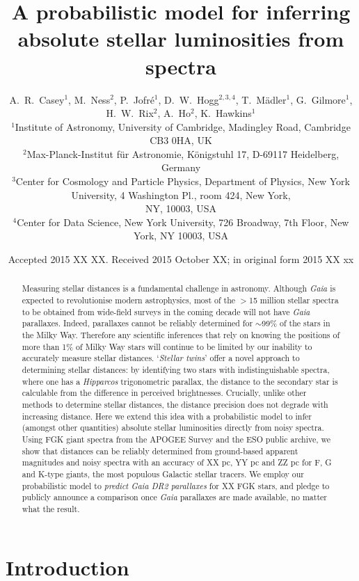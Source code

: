 \documentclass[useAMS,usenatbib]{mn2e}
\title[Inferring absolute stellar luminosities]{A probabilistic model for 
    inferring absolute stellar luminosities from spectra}
\author[Casey et al.]{A.~R.~Casey$^1$, M.~Ness$^2$, P.~Jofr\'e$^1$, 
    D.~W.~Hogg$^{2,3,4}$, T.~M\"adler$^1$, G.~Gilmore$^1$, \newauthor 
    H.~W.~Rix$^2$, A.~Ho$^2$, K.~Hawkins$^1$ \\ 
$^1$Institute of Astronomy, University of Cambridge, Madingley Road, Cambridge
    CB3 0HA, UK\\
$^2$Max-Planck-Institut f\"ur Astronomie, K\"onigstuhl 17, D-69117 Heidelberg,
    Germany\\
$^3$Center for Cosmology and Particle Physics, Department of Physics, New York
    University, 4 Washington Pl., room 424, New York, \\
    NY, 10003, USA\\
$^4$Center for Data Science, New York University, 726 Broadway, 7th Floor,
    New York, NY 10003, USA}
\begin{document}
\date{Accepted 2015 XX XX. Received 2015 October XX; in original form 2015 XX xx}

\pagerange{\pageref{firstpage}--\pageref{lastpage}} 

\maketitle

\label{firstpage}

\begin{abstract}
Measuring stellar distances is a fundamental challenge in astronomy. Although 
\textit{Gaia} is expected to revolutionise modern astrophysics, most of the 
$>$15 million stellar spectra to be obtained from wide-field surveys in the 
coming decade will not have \textit{Gaia} parallaxes. Indeed, parallaxes cannot 
be reliably determined for $\sim$99\% of the stars in the Milky Way. Therefore 
any scientific inferences that rely on knowing the positions of more than 1\% of 
Milky Way stars will continue to be limited by our inability to accurately 
measure stellar distances. `\textit{Stellar twins}' offer a novel approach to 
determining stellar distances: by identifying two stars with indistinguishable 
spectra, where one has a \textit{Hipparcos} trigonometric parallax, the distance
 to the secondary star is calculable from the difference in perceived 
 brightnesses. Crucially, unlike other methods to determine stellar distances, 
the distance precision does not degrade with increasing distance. Here we extend
 this idea with a probabilistic model to infer (amongst other quantities) 
absolute stellar luminosities directly from noisy spectra. Using FGK giant 
spectra from the APOGEE Survey and the ESO public archive, we show that 
distances can be reliably determined from ground-based apparent magnitudes and 
noisy spectra with an accuracy of XX pc, YY pc and ZZ pc for F, G and K-type 
giants, the most populous Galactic stellar tracers. We employ our probabilistic 
model to \textit{predict Gaia DR2 parallaxes} for XX FGK stars, and pledge to 
publicly announce a comparison once \textit{Gaia} parallaxes are made available,
 no matter what the result.
\end{abstract}

\begin{keywords}
\end{keywords}

\section{Introduction}
\end{document}
